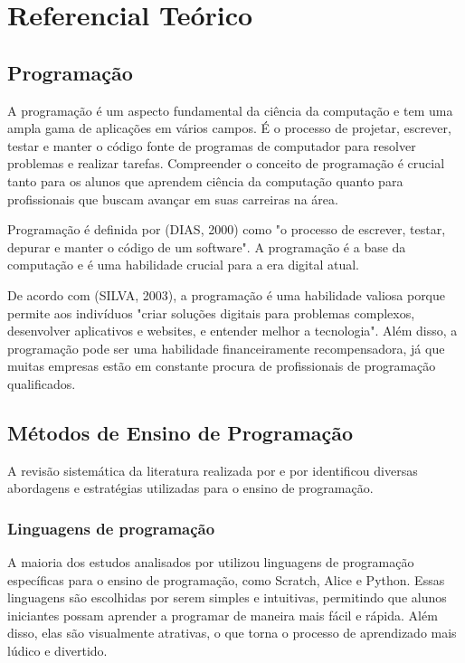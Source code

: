 \chapter[Referencial Teórico]{Referencial Teórico}

\section{Programação}

A programação é um aspecto fundamental da ciência da computação e tem uma ampla gama de aplicações em vários campos. É o processo de projetar, escrever, testar e manter o código fonte de programas de computador para resolver problemas e realizar tarefas. Compreender o conceito de programação é crucial tanto para os alunos que aprendem ciência da computação quanto para profissionais que buscam avançar em suas carreiras na área.

Programação é definida por (DIAS, 2000) como "o processo de escrever, testar, depurar e manter o código de um software". A programação é a base da computação e é uma habilidade crucial para a era digital atual.

De acordo com (SILVA, 2003), a programação é uma habilidade valiosa porque permite aos indivíduos "criar soluções digitais para problemas complexos, desenvolver aplicativos e websites, e entender melhor a tecnologia". Além disso, a programação pode ser uma habilidade financeiramente recompensadora, já que muitas empresas estão em constante procura de profissionais de programação qualificados.

\section{Métodos de Ensino de Programação}

A revisão sistemática da literatura realizada por \cite{Silva2014} e por \cite{Silva2018} identificou diversas abordagens e estratégias utilizadas para o ensino de programação.

\subsection{Linguagens de programação}

A maioria dos estudos analisados por \cite{Silva2014} utilizou linguagens de programação específicas para o ensino de programação, como Scratch, Alice e Python. Essas linguagens são escolhidas por serem simples e intuitivas, permitindo que alunos iniciantes possam aprender a programar de maneira mais fácil e rápida. Além disso, elas são visualmente atrativas, o que torna o processo de aprendizado mais lúdico e divertido.

